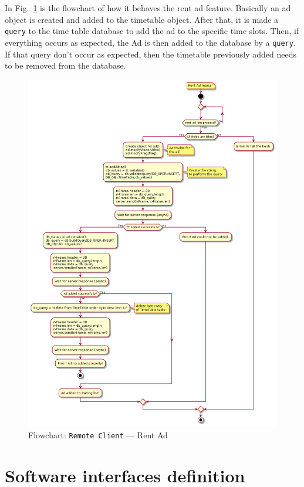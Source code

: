 In Fig.~\ref{fig:flow-rc-rent-ad} is the flowchart of how it behaves the rent ad feature.
Basically an ad object is created and added to the timetable object. After that, it is made a \texttt{query} to the time table database to add the ad to the specific time slots. Then, if everything occurs as expected, the Ad is then added to the database by a \texttt{query}. If that query don't occur as expected, then the timetable previously added needs to be removed from the database.
%
\begin{figure}[htb!]
\centering
    \includegraphics[width=0.8\columnwidth]{./img/flow-rc-rent-ad.png}
  \caption{Flowchart: \texttt{Remote Client} --- Rent Ad}%
\label{fig:flow-rc-rent-ad}
\end{figure}

\section{Software interfaces definition}
\label{sec:sw-interf-def}
%
% 

